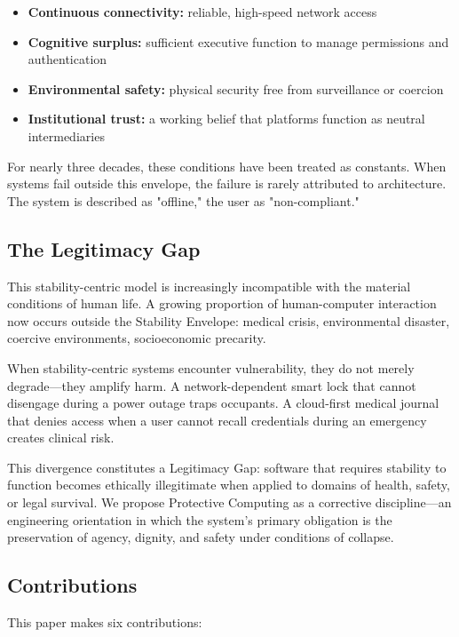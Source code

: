 \documentclass[acmsmall,review]{acmart}
\begin{document}
\begin{itemize}
    \item \textbf{Continuous connectivity:} reliable, high-speed network access
    \item \textbf{Cognitive surplus:} sufficient executive function to manage permissions and authentication
    \item \textbf{Environmental safety:} physical security free from surveillance or coercion
    \item \textbf{Institutional trust:} a working belief that platforms function as neutral intermediaries
\end{itemize}

For nearly three decades, these conditions have been treated as constants. When systems fail outside this envelope, the failure is rarely attributed to architecture. The system is described as "offline," the user as "non-compliant."

\subsection{The Legitimacy Gap}

This stability-centric model is increasingly incompatible with the material conditions of human life. A growing proportion of human-computer interaction now occurs outside the Stability Envelope: medical crisis, environmental disaster, coercive environments, socioeconomic precarity.

When stability-centric systems encounter vulnerability, they do not merely degrade---they amplify harm. A network-dependent smart lock that cannot disengage during a power outage traps occupants. A cloud-first medical journal that denies access when a user cannot recall credentials during an emergency creates clinical risk.

This divergence constitutes a Legitimacy Gap: software that requires stability to function becomes ethically illegitimate when applied to domains of health, safety, or legal survival. We propose Protective Computing as a corrective discipline---an engineering orientation in which the system's primary obligation is the preservation of agency, dignity, and safety under conditions of collapse.

\subsection{Contributions}

This paper makes six contributions:
\end{document}
